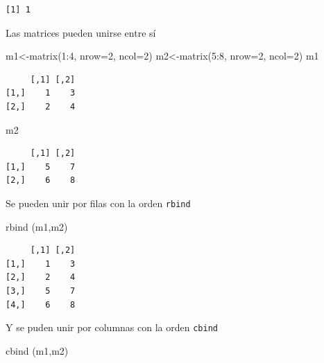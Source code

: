 \documentclass[
  letterpaper,
]{scrbook}
\newenvironment{Shaded}{\begin{snugshade}}{\end{snugshade}}
\newcommand{\AttributeTok}[1]{\textcolor[rgb]{0.40,0.45,0.13}{#1}}
\newcommand{\DecValTok}[1]{\textcolor[rgb]{0.68,0.00,0.00}{#1}}
\newcommand{\FunctionTok}[1]{\textcolor[rgb]{0.28,0.35,0.67}{#1}}
\newcommand{\NormalTok}[1]{\textcolor[rgb]{0.00,0.23,0.31}{#1}}
\newcommand{\OtherTok}[1]{\textcolor[rgb]{0.00,0.23,0.31}{#1}}
\newcommand{\SpecialCharTok}[1]{\textcolor[rgb]{0.37,0.37,0.37}{#1}}
\begin{document}
\begin{verbatim}
[1] 1
\end{verbatim}

Las matrices pueden unirse entre sí

\begin{Shaded}
\begin{Highlighting}[]
\NormalTok{m1}\OtherTok{\textless{}{-}}\FunctionTok{matrix}\NormalTok{(}\DecValTok{1}\SpecialCharTok{:}\DecValTok{4}\NormalTok{, }\AttributeTok{nrow=}\DecValTok{2}\NormalTok{, }\AttributeTok{ncol=}\DecValTok{2}\NormalTok{)}
\NormalTok{m2}\OtherTok{\textless{}{-}}\FunctionTok{matrix}\NormalTok{(}\DecValTok{5}\SpecialCharTok{:}\DecValTok{8}\NormalTok{, }\AttributeTok{nrow=}\DecValTok{2}\NormalTok{, }\AttributeTok{ncol=}\DecValTok{2}\NormalTok{)}
\NormalTok{m1}
\end{Highlighting}
\end{Shaded}

\begin{verbatim}
     [,1] [,2]
[1,]    1    3
[2,]    2    4
\end{verbatim}

\begin{Shaded}
\begin{Highlighting}[]
\NormalTok{m2}
\end{Highlighting}
\end{Shaded}

\begin{verbatim}
     [,1] [,2]
[1,]    5    7
[2,]    6    8
\end{verbatim}

Se pueden unir por filas con la orden \texttt{rbind}

\begin{Shaded}
\begin{Highlighting}[]
\FunctionTok{rbind}\NormalTok{ (m1,m2)}
\end{Highlighting}
\end{Shaded}

\begin{verbatim}
     [,1] [,2]
[1,]    1    3
[2,]    2    4
[3,]    5    7
[4,]    6    8
\end{verbatim}

Y se puden unir por columnas con la orden \texttt{cbind}

\begin{Shaded}
\begin{Highlighting}[]
\FunctionTok{cbind}\NormalTok{ (m1,m2)}
\end{Highlighting}
\end{Shaded}
\end{document}
